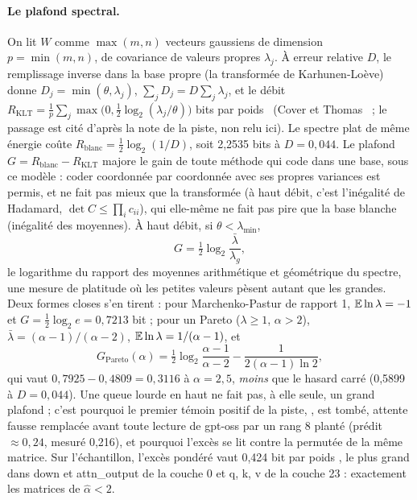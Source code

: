 \paragraph{Le plafond spectral.} On lit $W$ comme $\max(m, n)$ vecteurs gaussiens de dimension $p = \min(m, n)$, de covariance de valeurs propres $\lambda_j$. À erreur relative $D$, le remplissage inverse dans la base propre (la transformée de Karhunen-Loève) donne $D_j = \min(\theta, \lambda_j)$, $\sum_j D_j = D\sum_j\lambda_j$, et le débit $R_{\mathrm{KLT}} = \frac1p\sum_j\max\bigl(0, \tfrac12\log_2(\lambda_j/\theta)\bigr)$ bits par poids \litt~(Cover et Thomas~\cite{cover2006} ; le passage est cité d'après la note de la piste, non relu ici). Le spectre plat de même énergie coûte $R_{\text{blanc}} = \tfrac12\log_2(1/D)$, soit 2,2535 bits à $D = 0{,}044$. Le plafond $G = R_{\text{blanc}} - R_{\mathrm{KLT}}$ majore le gain de toute méthode qui code dans une base, sous ce modèle : coder coordonnée par coordonnée avec ses propres variances est permis, et ne fait pas mieux que la transformée (à haut débit, c'est l'inégalité de Hadamard, $\det C \le \prod_i c_{ii}$), qui elle-même ne fait pas pire que la base blanche (inégalité des moyennes). À haut débit, si $\theta < \lambda_{\min}$,
\begin{equation}\label{t3spe:eq:platitude}
G = \tfrac12\log_2\frac{\bar\lambda}{\lambda_g},
\end{equation}
le logarithme du rapport des moyennes arithmétique et géométrique du spectre, une mesure de platitude où les petites valeurs pèsent autant que les grandes. Deux formes closes s'en tirent \calc : pour Marchenko-Pastur de rapport 1, $\mathbb{E}\ln\lambda = -1$ et $G = \tfrac12\log_2 e = 0{,}7213$ bit ; pour un Pareto ($\lambda \ge 1$, $\alpha > 2$), $\bar\lambda = (\alpha - 1)/(\alpha - 2)$, $\mathbb{E}\ln\lambda = 1/(\alpha - 1)$, et
\begin{equation}\label{t3spe:eq:pareto}
G_{\text{Pareto}}(\alpha) = \tfrac12\log_2\frac{\alpha - 1}{\alpha - 2} - \frac{1}{2(\alpha - 1)\ln 2},
\end{equation}
qui vaut $0{,}7925 - 0{,}4809 = 0{,}3116$ à $\alpha = 2{,}5$, \emph{moins} que le hasard carré (0,5899 à $D = 0{,}044$). Une queue lourde en haut ne fait pas, à elle seule, un grand plafond ; c'est pourquoi le premier témoin positif de la piste, , est tombé, attente fausse remplacée avant toute lecture de gpt-oss par un rang 8 planté (prédit $\approx 0{,}24$, mesuré 0,216), et pourquoi l'excès se lit contre la permutée de la même matrice. Sur l'échantillon, l'excès pondéré vaut 0,424 bit par poids , le plus grand dans down et attn\_output de la couche 0 et q, k, v de la couche 23 : exactement les matrices de $\hat\alpha < 2$.


